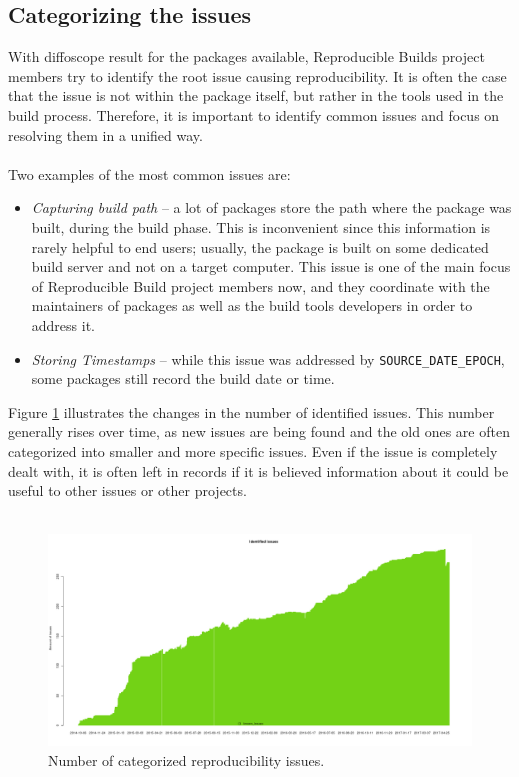 {\subsection[Categorizing the issues]{Categorizing the issues} 
With diffoscope result for the packages available, Reproducible Builds project members try to identify the root issue causing reproducibility. It is often the case that the issue is not within the package itself, but rather in the tools used in the build process. Therefore, it is important to identify common issues and focus on resolving them in a unified way.\\\\
Two examples of the most common issues are:
\begin{itemize}[noitemsep]
\item \textit{Capturing build path} -- a lot of packages store the path where the package was built, during the build phase. This is inconvenient since this information is rarely helpful to end users; usually, the package is built on some dedicated build server and not on a target computer. This issue is one of the main focus of Reproducible Build project members now, and they coordinate with the maintainers of packages as well as the build tools developers in order to address it.
\item \textit{Storing Timestamps} -- while this issue was addressed by \texttt{SOURCE\_DATE\_EPOCH}, some packages still record the build date or time.
\end{itemize}
Figure \ref{fig:stats_issues} illustrates the changes in the number of identified issues. This number generally rises over time, as new issues are being found and the old ones are often categorized into smaller and more specific issues. Even if the issue is completely dealt with, it is often left in records if it is believed information about it could be useful to other issues or other projects.\\\\
\FloatBarrier

\begin{figure}[h]
\centering
\includegraphics[width=1.05\textwidth]{fig/stats_issues.png}
\caption{\label{fig:stats_issues}Number of categorized reproducibility issues. \autocite{tests-rbo}}
\end{figure}

}
